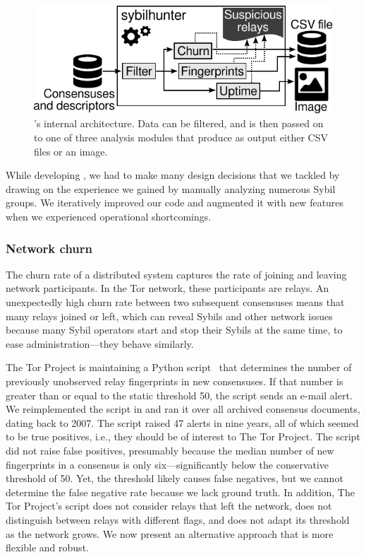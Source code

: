 \begin{figure}[t]
	\centering
	\includegraphics[width=0.9\linewidth]{diagrams/internal-architecture.pdf}
	\caption{\Sys's internal architecture.  Data can be filtered, and is then
	passed on to one of three analysis modules that produce as output either
	CSV files or an image.}
	\label{fig:shr-internal}
\end{figure}

While developing \sys, we had to make many design decisions that we
tackled by drawing on the experience we gained by manually analyzing numerous
Sybil groups.  We iteratively improved our code and augmented it with new
features when we experienced operational shortcomings.

\subsubsection{Network churn}
\label{sec:churn-time-series}
The churn rate of a distributed system captures the rate of joining and leaving
network participants.  In the Tor network, these participants are relays.  An
unexpectedly high churn rate between two subsequent consensuses means that many
relays joined or left, which can reveal Sybils and other network issues because
many Sybil operators start and stop their Sybils at the same time, to ease
administration---they behave similarly.

The Tor Project is maintaining a Python script~\cite{doctor} that determines the
number of previously unobserved relay fingerprints in new consensuses.  If that
number is greater than or equal to the static threshold 50, the script sends an
e-mail alert.  We reimplemented the script in \sys and ran it over all archived
consensus documents, dating back to 2007.  The script raised 47 alerts in nine
years, all of which seemed to be true positives, i.e., they should be of
interest to The Tor Project.  The script did not raise false positives,
presumably because the median number of new fingerprints in a consensus is only
six---significantly below the conservative threshold of 50.  Yet, the threshold
likely causes false negatives, but we cannot determine the false negative rate
because we lack ground truth.  In addition, The Tor Project's script does not
consider relays that left the network, does not distinguish between relays with
different flags, and does not adapt its threshold as the network grows.  We now
present an alternative approach that is more flexible and robust.


